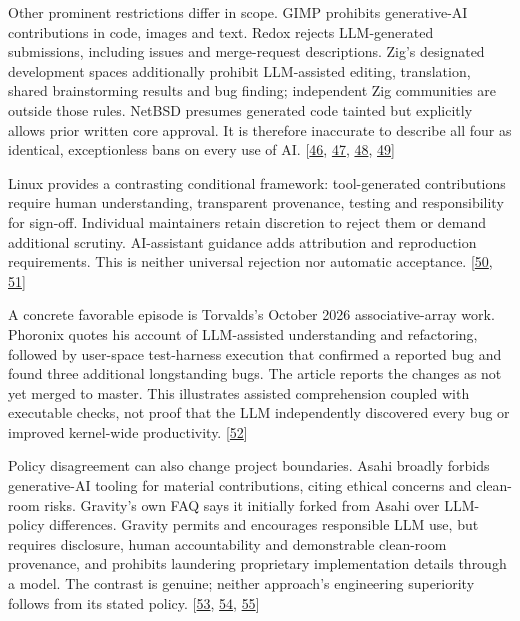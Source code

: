 Other prominent restrictions differ in scope. GIMP prohibits generative-AI contributions in code, images and text. Redox rejects LLM-generated submissions, including issues and merge-request descriptions. Zig's designated development spaces additionally prohibit LLM-assisted editing, translation, shared brainstorming results and bug finding; independent Zig communities are outside those rules. NetBSD presumes generated code tainted but explicitly allows prior written core approval. It is therefore inaccurate to describe all four as identical, exceptionless bans on every use of AI. [\hyperlink{ref-gimppolicy2026}{46}, \hyperlink{ref-redoxpolicy2026}{47}, \hyperlink{ref-zigpolicy2026}{48}, \hyperlink{ref-netbsdpolicy2024}{49}]


Linux provides a contrasting conditional framework: tool-generated contributions require human understanding, transparent provenance, testing and responsibility for sign-off. Individual maintainers retain discretion to reject them or demand additional scrutiny. AI-assistant guidance adds attribution and reproduction requirements. This is neither universal rejection nor automatic acceptance. [\hyperlink{ref-linuxgenerated2026}{50}, \hyperlink{ref-linuxassistants2026}{51}]


A concrete favorable episode is Torvalds's October 2026 associative-array work. Phoronix quotes his account of LLM-assisted understanding and refactoring, followed by user-space test-harness execution that confirmed a reported bug and found three additional longstanding bugs. The article reports the changes as not yet merged to master. This illustrates assisted comprehension coupled with executable checks, not proof that the LLM independently discovered every bug or improved kernel-wide productivity. [\hyperlink{ref-torvaldsassoc2026}{52}]


Policy disagreement can also change project boundaries. Asahi broadly forbids generative-AI tooling for material contributions, citing ethical concerns and clean-room risks. Gravity's own FAQ says it initially forked from Asahi over LLM-policy differences. Gravity permits and encourages responsible LLM use, but requires disclosure, human accountability and demonstrable clean-room provenance, and prohibits laundering proprietary implementation details through a model. The contrast is genuine; neither approach's engineering superiority follows from its stated policy. [\hyperlink{ref-asahipolicy2026}{53}, \hyperlink{ref-gravityabout2026}{54}, \hyperlink{ref-gravitypolicy2026}{55}]


